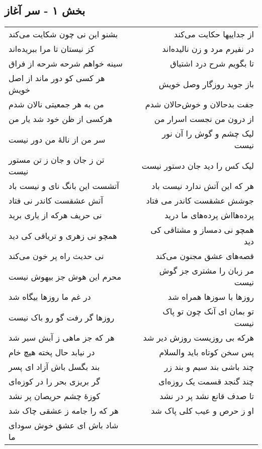 \begin{center}
\section*{بخش ۱ - سر آغاز}
\label{sec:sh001}
\begin{longtable}{l p{0.5cm} r}
بشنو این نی چون شکایت می‌کند
&&
از جداییها حکایت می‌کند
\\
کز نیستان تا مرا ببریده‌اند
&&
در نفیرم مرد و زن نالیده‌اند
\\
سینه خواهم شرحه شرحه از فراق
&&
تا بگویم شرح درد اشتیاق
\\
هر کسی کو دور ماند از اصل خویش
&&
باز جوید روزگار وصل خویش
\\
من به هر جمعیتی نالان شدم
&&
جفت بدحالان و خوش‌حالان شدم
\\
هرکسی از ظن خود شد یار من
&&
از درون من نجست اسرار من
\\
سر من از نالهٔ من دور نیست
&&
لیک چشم و گوش را آن نور نیست
\\
تن ز جان و جان ز تن مستور نیست
&&
لیک کس را دید جان دستور نیست
\\
آتشست این بانگ نای و نیست باد
&&
هر که این آتش ندارد نیست باد
\\
آتش عشقست کاندر نی فتاد
&&
جوشش عشقست کاندر می فتاد
\\
نی حریف هرکه از یاری برید
&&
پرده‌هااش پرده‌های ما درید
\\
همچو نی زهری و تریاقی کی دید
&&
همچو نی دمساز و مشتاقی کی دید
\\
نی حدیث راه پر خون می‌کند
&&
قصه‌های عشق مجنون می‌کند
\\
محرم این هوش جز بیهوش نیست
&&
مر زبان را مشتری جز گوش نیست
\\
در غم ما روزها بیگاه شد
&&
روزها با سوزها همراه شد
\\
روزها گر رفت گو رو باک نیست
&&
تو بمان ای آنک چون تو پاک نیست
\\
هر که جز ماهی ز آبش سیر شد
&&
هرکه بی روزیست روزش دیر شد
\\
در نیابد حال پخته هیچ خام
&&
پس سخن کوتاه باید والسلام
\\
بند بگسل باش آزاد ای پسر
&&
چند باشی بند سیم و بند زر
\\
گر بریزی بحر را در کوزه‌ای
&&
چند گنجد قسمت یک روزه‌ای
\\
کوزهٔ چشم حریصان پر نشد
&&
تا صدف قانع نشد پر در نشد
\\
هر که را جامه ز عشقی چاک شد
&&
او ز حرص و عیب کلی پاک شد
\\
شاد باش ای عشق خوش سودای ما

\end{longtable}
\end{center}

